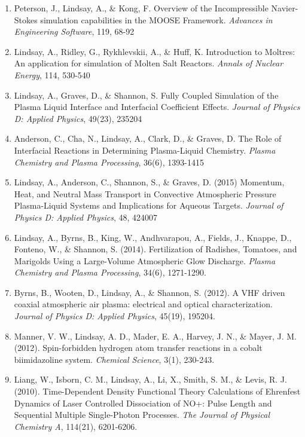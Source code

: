 \begin{enumerate}
  \item Peterson, J., Lindsay, A., \& Kong, F. Overview of the Incompressible Navier-Stokes simulation capabilities in the MOOSE Framework. \textit{Advances in Engineering Software}, 119, 68-92
  \item Lindsay, A., Ridley, G., Rykhlevskii, A., \& Huff, K. Introduction to Moltres: An application for simulation of Molten Salt Reactors. \textit{Annals of Nuclear Energy}, 114, 530-540
  \item Lindsay, A., Graves, D., \& Shannon, S. Fully Coupled Simulation
  of the Plasma Liquid Interface and Interfacial Coefficient
  Effects. \textit{Journal of Physics D: Applied Physics}, 49(23), 235204
  \item Anderson, C., Cha, N., Lindsay, A., Clark, D., \& Graves, D. The
  Role of Interfacial Reactions in Determining Plasma-Liquid
  Chemistry. \textit{Plasma Chemistry and Plasma Processing}, 36(6), 1393-1415
  \item Lindsay, A., Anderson, C., Shannon, S., \& Graves, D. (2015) Momentum, Heat, and Neutral Mass Transport in Convective Atmospheric Pressure Plasma-Liquid Systems and Implications for Aqueous Targets. \textit{Journal of Physics D: Applied Physics}, 48, 424007
  \item Lindsay, A., Byrns, B., King, W., Andhvarapou, A., Fields, J., Knappe, D., Fonteno, W., \& Shannon, S. (2014). Fertilization of Radishes, Tomatoes, and Marigolds Using a Large-Volume Atmospheric Glow Discharge. \textit{Plasma Chemistry and Plasma Processing}, 34(6), 1271-1290.
  \item Byrns, B., Wooten, D., Lindsay, A., \& Shannon, S. (2012). A VHF driven coaxial atmospheric air plasma: electrical and optical characterization. \textit{Journal of Physics D: Applied Physics}, 45(19), 195204.
  \item Manner, V. W., Lindsay, A. D., Mader, E. A., Harvey, J. N., \& Mayer, J. M. (2012). Spin-forbidden hydrogen atom transfer reactions in a cobalt biimidazoline system. \textit{Chemical Science}, 3(1), 230-243.
  \item Liang, W., Isborn, C. M., Lindsay, A., Li, X., Smith, S. M., \& Levis,
    R. J. (2010). Time-Dependent Density Functional Theory Calculations of
    Ehrenfest Dynamics of Laser Controlled Dissociation of NO+: Pulse Length and
    Sequential Multiple Single-Photon Processes. \textit{The Journal of Physical
      Chemistry A}, 114(21), 6201-6206.
\end{enumerate}
